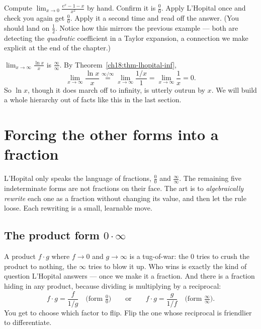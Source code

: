 \begin{labbox}
Compute $\displaystyle\lim_{x\to 0}\frac{e^x-1-x}{x^2}$ by hand. Confirm it is
$\tfrac00$. Apply L'Hopital once and check you again get $\tfrac00$. Apply it a second
time and read off the answer. (You should land on $\tfrac12$. Notice how this mirrors
the previous example --- both are detecting the \emph{quadratic} coefficient in a
Taylor expansion, a connection we make explicit at the end of the chapter.)
\end{labbox}

\begin{example}\label{ch18:ex-lnx}
$\displaystyle\lim_{x\to\infty}\frac{\ln x}{x}$ is $\tfrac{\infty}{\infty}$. By
Theorem~\ref{ch18:thm-lhopital-inf},
\[
\lim_{x\to\infty}\frac{\ln x}{x}\overset{\infty/\infty}{=}
\lim_{x\to\infty}\frac{1/x}{1}=\lim_{x\to\infty}\frac{1}{x}=0.
\]
So $\ln x$, though it does march off to infinity, is utterly outrun by $x$. We will
build a whole hierarchy out of facts like this in the last section.
\end{example}

\section{Forcing the other forms into a fraction}

L'Hopital only speaks the language of fractions, $\tfrac00$ and
$\tfrac{\infty}{\infty}$. The remaining five indeterminate forms are not fractions on
their face. The art is to \emph{algebraically rewrite} each one as a fraction without
changing its value, and then let the rule loose. Each rewriting is a small, learnable
move.

\subsection{The product form $0\cdot\infty$}

A product $f\cdot g$ where $f\to 0$ and $g\to\infty$ is a tug-of-war: the $0$ tries to
crush the product to nothing, the $\infty$ tries to blow it up. Who wins is exactly the
kind of question L'Hopital answers --- once we make it a fraction. And there is a
fraction hiding in any product, because dividing is multiplying by a reciprocal:
\[
f\cdot g=\frac{f}{1/g}\quad\Big(\text{form }\tfrac00\Big)
\qquad\text{or}\qquad
f\cdot g=\frac{g}{1/f}\quad\Big(\text{form }\tfrac{\infty}{\infty}\Big).
\]
You get to choose which factor to flip. Flip the one whose reciprocal is friendlier to
differentiate.

